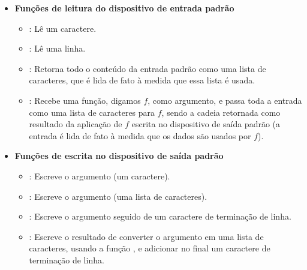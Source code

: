 \begin{itemize}

\item {\bf Funções de leitura do dispositivo de entrada padrão}

  \begin{itemize}

    \item {}: Lê um caractere.

    \item {}: Lê uma linha.

    \item {}: Retorna todo o conteúdo da
      entrada padrão como uma lista de caracteres, que é lida de fato
      à medida que essa lista é usada.

    \item {}: Recebe uma
      função, digamos $f$, como argumento, e passa toda a entrada como
      uma lista de caracteres para $f$, sendo a cadeia retornada como
      resultado da aplicação de $f$ escrita no dispositivo de saída
      padrão (a entrada é lida de fato à medida que os dados são
      usados por $f$).

  \end{itemize}
    
\item {\bf Funções de escrita no dispositivo de saída padrão}

  \begin{itemize}
    
    \item {}: Escreve o argumento (um caractere).

    \item {}: Escreve o argumento (uma
      lista de caracteres).

    \item {}: Escreve o argumento
      seguido de um caractere de terminação de linha.

    \item {}: Escreve o resultado de
      converter o argumento em uma lista de caracteres, usando a
      função , e adicionar no final um caractere de
      terminação de linha.

  \end{itemize}

\end{itemize}

